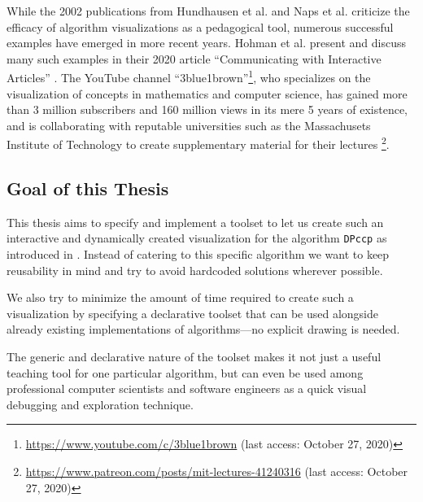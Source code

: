 
While the 2002 publications from Hundhausen et al. \cite{hundhausen2002meta} and Naps et al. \cite{naps2002exploring} criticize the efficacy of algorithm visualizations as a pedagogical tool, numerous successful examples have emerged in more recent years.
Hohman et al. present and discuss many such examples in their 2020 article ``Communicating with Interactive Articles'' \cite{hohman2020communicating}.
The YouTube channel ``3blue1brown''\footnote{\url{https://www.youtube.com/c/3blue1brown} (last access: October 27, 2020)}, who specializes on the visualization of concepts in mathematics and computer science, has gained more than 3 million subscribers and 160 million views in its mere 5 years of existence, and is collaborating with reputable universities such as the Massachusets Institute of Technology to create supplementary material for their lectures \footnote{\url{https://www.patreon.com/posts/mit-lectures-41240316} (last access: October 27, 2020)}.

\subsection{Goal of this Thesis}
This thesis aims to specify and implement a toolset to let us create such an interactive and dynamically created visualization for the algorithm \texttt{DPccp} as introduced in \cite{moerkotte2006analysis}. Instead of catering to  this specific algorithm we want to keep reusability in mind and try to avoid hardcoded solutions wherever possible.

We also try to minimize the amount of time required to create such a visualization by specifying a declarative toolset that can be used alongside already existing implementations of algorithms—no explicit drawing is needed.

The generic and declarative nature of the toolset makes it not just a useful teaching tool for one particular algorithm, but can even be used among professional computer scientists and software engineers as a quick visual debugging and exploration technique.
